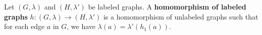 \begin{definition}
    \label{def:graph:homomorphism}
    Let \( (G,\lambda) \) and \( (H,\lambda') \) be labeled graphs. A \textbf{homomorphism of labeled graphs} $h:(G,\lambda) \rightarrow (H,\lambda')$ is a homomorphism of unlabeled graphs such that for each edge \( a \) in \( G \), we have \( \lambda (a) = \lambda' (h_1 (a)) \).
\end{definition}